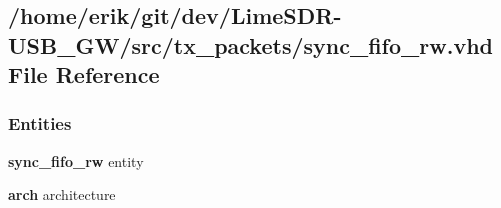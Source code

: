 \subsection{/home/erik/git/dev/\+Lime\+S\+D\+R-\/\+U\+S\+B\+\_\+\+G\+W/src/tx\+\_\+packets/sync\+\_\+fifo\+\_\+rw.vhd File Reference}
\label{tx__packets_2sync__fifo__rw_8vhd}
\subsubsection*{Entities}
\begin{DoxyCompactItemize}
\item 
{\bf sync\+\_\+fifo\+\_\+rw} entity
\item 
{\bf arch} architecture
\end{DoxyCompactItemize}
